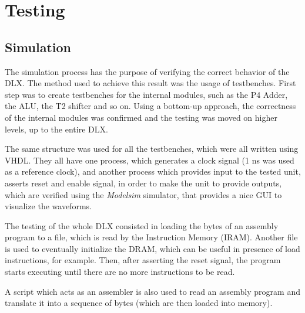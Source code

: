 \chapter{Testing}
\label{Simulation}

\section{Simulation}

The simulation process has the purpose of verifying the correct behavior of the DLX.
The method used to achieve this result was the usage of testbenches.
First step was to create testbenches for the internal modules, such as the P4 Adder, the ALU, the T2 shifter and so on.
Using a bottom-up approach, the correctness of the internal modules was confirmed and the testing was moved on higher levels, up to the entire DLX.

The same structure was used for all the testbenches, which were all written using VHDL.
They all have one process, which generates a clock signal (1 ns was used as a reference clock), and another process which
provides input to the tested unit, asserts reset and enable signal, in order to make the unit to provide outputs, which are verified using the \textit{Modelsim} simulator, that provides
a nice GUI to visualize the waveforms.

The testing of the whole DLX consisted in loading the bytes of an assembly program to a file, which is read by the Instruction Memory (IRAM).
Another file is used to eventually initialize the DRAM, which can be useful in presence of load instructions, for example.
Then, after asserting the reset signal, the program starts executing until there are no more instructions to be read.

A script which acts as an assembler is also used to read an assembly program and translate it into a sequence of bytes (which are then loaded into memory).








